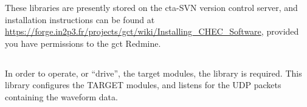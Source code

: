 These libraries are presently stored on the \gls{cta}-SVN version control server, and installation instructions can be found at \url{https://forge.in2p3.fr/projects/gct/wiki/Installing_CHEC_Software}, provided you have permissions to the \gls{gct} Redmine.

\subsection{}

In order to operate, or ``drive'', the \gls{target} modules, the  library is required. This \cpp library configures the TARGET modules, and listens for the UDP packets containing the waveform data.

\subsection{}

